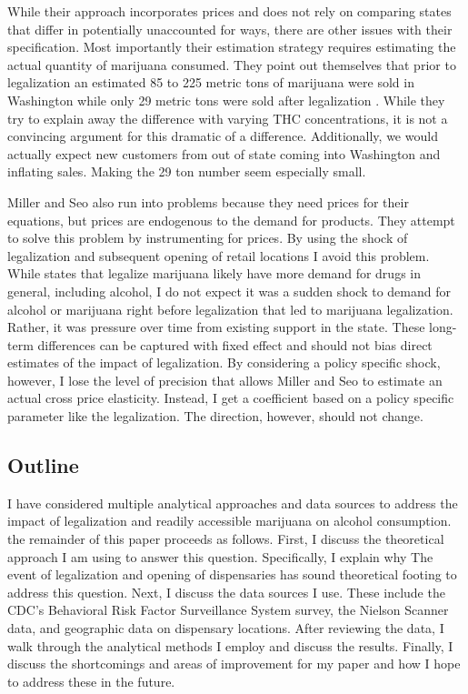\documentclass[11pt]{article}
\begin{document}
While their approach incorporates prices and does not rely on comparing states that differ in potentially unaccounted for ways, there are other issues with their specification. Most importantly their estimation strategy requires estimating the actual quantity of marijuana consumed. They point out themselves that prior to legalization an estimated 85 to 225 metric tons of marijuana were sold in Washington while only 29 metric tons were sold after legalization \cite[p.~13]{ miller_seo_2018}.  While they try to explain away the difference with varying THC concentrations, it is not a convincing argument for this dramatic of a difference. Additionally, we would actually expect new customers from out of state coming into Washington and inflating sales. Making the 29 ton number seem especially small. \par


Miller and Seo also run into problems because they need prices for their equations, but prices are endogenous to the demand for products. They attempt to solve this problem by instrumenting for prices. By using the shock of legalization and subsequent opening of retail locations I avoid this problem. While states that legalize marijuana likely have more demand for drugs in general, including alcohol, I do not expect it was a sudden shock to demand for alcohol or marijuana right before legalization that led to marijuana legalization. Rather, it was pressure over time from existing support in the state. These long-term differences can be captured with fixed effect and should not bias direct estimates of the impact of legalization. By considering a policy specific shock, however, I lose the level of precision that allows Miller and Seo to estimate an actual cross price elasticity. Instead, I get a coefficient based on a policy specific parameter like the legalization. The direction, however, should not change. 





\subsection{Outline}



I have considered multiple analytical approaches and data sources to address the impact of legalization and readily accessible marijuana on alcohol consumption. the remainder of this paper proceeds as follows. First, I discuss the theoretical approach I am using to answer this question. Specifically, I explain why The event of legalization and opening of dispensaries has sound theoretical footing to address this question. Next, I discuss the data sources I use. These include the CDC's Behavioral Risk Factor Surveillance System survey, the Nielson Scanner data, and geographic data on dispensary locations. After reviewing the data, I  walk through the analytical methods I employ and discuss the results. Finally, I discuss the shortcomings and areas of improvement for my paper and how I hope to address these in the future. 
\end{document}
